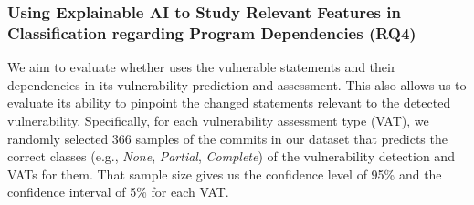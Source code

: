 

\subsubsection{{\bf Using Explainable AI to Study Relevant Features in Classification regarding Program Dependencies (RQ4)}}
\label{sec:ai}


We aim to evaluate whether {\tool} uses the vulnerable statements
and their dependencies in its vulnerability prediction and
assessment. This also allows us to evaluate its ability to pinpoint
the changed statements relevant to the detected vulnerability.
Specifically, for each vulnerability assessment type (VAT), we
randomly selected 366 samples of the commits in our dataset that
{\tool} predicts the correct classes (e.g., {\em None}, {\em Partial},
{\em Complete}) of the vulnerability detection and VATs for them. That sample size gives us the confidence level of 95\% and
the confidence interval of 5\% for each VAT.

